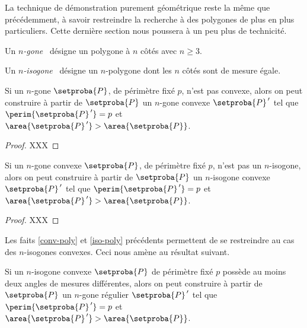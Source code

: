 La technique de démonstration purement géométrique reste la même que précédemment, à savoir restreindre la recherche à des polygones de plus en plus particuliers. Cette dernière section nous poussera à un peu plus de technicité.




\begin{defi}
	Un \og \emph{$n$-gone} \fg\ désigne un polygone à $n$ côtés avec $n \geq 3$.
\end{defi}


\begin{defi}
	Un \og \emph{$n$-isogone} \fg\ désigne un $n$-polygone dont les $n$ côtés sont de mesure égale.
\end{defi}




\begin{fact}\label{conv-poly}
	Si un $n$-gone $\setproba{P}$, de périmètre fixé $p$, n'est pas convexe, alors on peut construire à partir de $\setproba{P}$ un $n$-gone convexe $\setproba{P}^{\,\prime}$ tel que $\perim{\setproba{P}^{\,\prime}} = p$ et $\area{\setproba{P}^{\,\prime}} > \area{\setproba{P}}$.
\end{fact}


\begin{proof}
	XXX
\end{proof}




\begin{fact}\label{iso-poly}
	Si un $n$-gone convexe $\setproba{P}$, de périmètre fixé $p$, n'est pas un $n$-isogone, alors on peut construire à partir de $\setproba{P}$ un $n$-isogone convexe $\setproba{P}^{\,\prime}$ tel que $\perim{\setproba{P}^{\,\prime}} = p$ et $\area{\setproba{P}^{\,\prime}} > \area{\setproba{P}}$.
\end{fact}


\begin{proof}
	XXX
\end{proof}




Les faits \ref{conv-poly} et \ref{iso-poly} précédents permettent de se restreindre au cas des $n$-isogones convexes. Ceci nous amène au résultat suivant.

\begin{fact}\label{reg-poly}
	Si un $n$-isogone convexe $\setproba{P}$ de périmètre fixé $p$ possède au moins deux angles de mesures différentes, alors on peut construire à partir de $\setproba{P}$ un $n$-gone régulier $\setproba{P}^{\,\prime}$ tel que $\perim{\setproba{P}^{\,\prime}} = p$ et $\area{\setproba{P}^{\,\prime}} > \area{\setproba{P}}$.
\end{fact}


